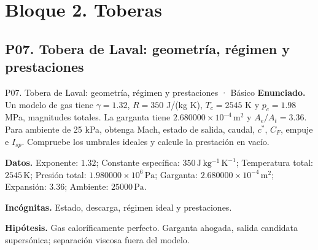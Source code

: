 \chapter{Bloque 2. Toberas}
\section{P07. Tobera de Laval: geometría, régimen y prestaciones}
\begin{studiumworked}{P07. Tobera de Laval: geometría, régimen y prestaciones · Básico}
\textbf{Enunciado.} Un modelo de gas tiene $\gamma=1.32$, $R=350$ J/(kg K), $T_c=2545$ K y $p_c=1.98$ MPa, magnitudes totales. La garganta tiene $2.680000\times10^{-4}\,\mathrm{m^2}$ y $A_e/A_t=3.36$. Para ambiente de 25 kPa, obtenga Mach, estado de salida, caudal, $c^*$, $C_F$, empuje e $I_{sp}$. Compruebe los umbrales ideales y calcule la prestación en vacío.

\textbf{Datos.} Exponente: $1.32$; Constante específica: $350\,\mathrm{J\,kg^{-1}\,K^{-1}}$; Temperatura total: $2545\,\mathrm{K}$; Presión total: $1.980000\times10^{6}\,\mathrm{Pa}$; Garganta: $2.680000\times10^{-4}\,\mathrm{m^2}$; Expansión: $3.36$; Ambiente: $25000\,\mathrm{Pa}$.

\textbf{Incógnitas.} Estado, descarga, régimen ideal y prestaciones.

\textbf{Hipótesis.} Gas caloríficamente perfecto. Garganta ahogada, salida candidata supersónica; separación viscosa fuera del modelo.


\end{studiumworked}
